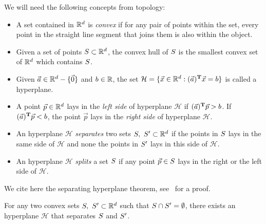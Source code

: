 \documentclass{article}
\newcommand{\cH}{\mathcal{H}}
\begin{document}
We will need the following concepts from topology:
\begin{itemize}
\item A  set contained in $\mathbb{R}^d$  is \textit{convex} if for any
  pair of points within the set, every point in the straight line
  segment that joins them is also within the object.
\item Given a set of points $S\subset\mathbb{R}^{d}$, the convex hull of $S$ is the
  smallest convex set of $\mathbb{R}^{d}$ which contains $S$.
\item   Given $\vec{a}\in\mathbb{R}^d-\{\vec{0}\}$ and $b\in\mathbb{R}$, the set 
  $\cH = \{\vec{x}\in\RR^d : \transpose{\vec{a}}\vec{x}=b\}$ is called
  a hyperplane.
\item A point $\vec{p}\in\mathbb{R}^{d}$ lays in the \textit{left side} of
  hyperplane $\cH$ if $(\vec{a})^{\textbf{T}}\vec{p}>b$. If 
  $(\vec{a})^{\textbf{T}}\vec{p} < b$, the point $\vec{p}$ lays  in the
  \textit{right side} of hyperplane $\cH$.
\item An hyperplane $\cH$ \textit{separates} two sets $S,\
  S'\subset\mathbb{R}^d$ if  the points in $S$ lays in the same side
  of $\cH$ and none the points in $S'$ lays in this side of
  $\cH$.
\item An hyperplane $\cH$ \textit{splits} a set $S$ if any point
  $\vec{p}\in S$ lays in the right or the left side of $\cH$. 
\end{itemize}
We cite here  the separating hyperplane theorem, 
see~\cite[page 46]{BoydLieven04} for a proof. 
\begin{lemma}
  \label{lem:maximum_separation}
  For any two convex sets $S,\ S'\subset \mathbb{R}^d$ such that
  $S\cap S' =  \emptyset$,  there exists an   hyperplane $\cH$
  that separates $S$ and $S'$.
\end{lemma}
\end{document}

